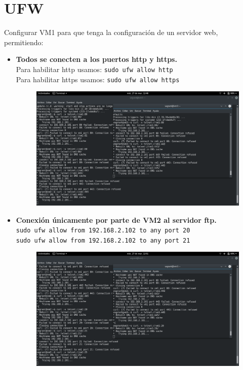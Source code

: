 \documentclass[12pt,letterpaper]{article}
\begin{document}
\section{UFW}
Configurar VM1 para que tenga la configuración de un servidor web, permitiendo:
\begin{itemize}
	\item \textbf{Todos se conecten a los puertos http y https.} \\
	Para habilitar http usamos: \texttt{sudo ufw allow http} \\
	Para habilitar https usamos: \texttt{sudo ufw allow https}
	\begin{figure}[h]
		\centering
		\includegraphics[scale=0.34]{http2.png}
	\end{figure}
\newpage
	\item \textbf{Conexión únicamente por parte de VM2 al servidor ftp.} \\
	\texttt{sudo ufw allow from 192.168.2.102 to any port 20}\\
	\texttt{sudo ufw allow from 192.168.2.102 to any port 21}
	\begin{figure}[h]
		\centering
		\includegraphics[scale=0.34]{ftp2.png}

\end{figure}
\end{itemize}
\end{document}
